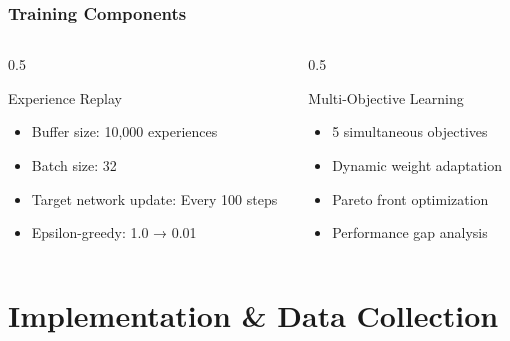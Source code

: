 \documentclass{beamer}
\begin{document}
\begin{frame}
\frametitle{Training Components}
\begin{columns}
\begin{column}{0.5\textwidth}
\begin{block}{Experience Replay}
\begin{itemize}
\item Buffer size: 10,000 experiences
\item Batch size: 32
\item Target network update: Every 100 steps
\item Epsilon-greedy: 1.0 → 0.01
\end{itemize}
\end{block}
\end{column}
\begin{column}{0.5\textwidth}
\begin{block}{Multi-Objective Learning}
\begin{itemize}
\item 5 simultaneous objectives
\item Dynamic weight adaptation
\item Pareto front optimization
\item Performance gap analysis
\end{itemize}
\end{block}
\end{column}
\end{columns}
\end{frame}

\section{Implementation \& Data Collection}
\end{document}
